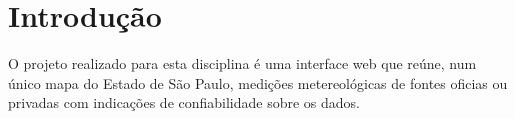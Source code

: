 
\newpage
\section{Introdução}

O projeto realizado para esta disciplina é uma interface web que reúne, num único mapa do Estado de São Paulo, medições metereológicas de fontes oficias ou privadas com indicações de confiabilidade sobre os dados. 
